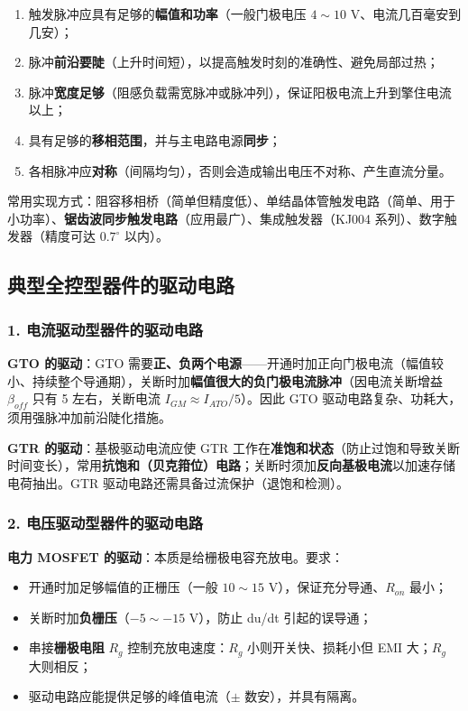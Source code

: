 \begin{enumerate}
  \item 触发脉冲应具有足够的\textbf{幅值和功率}（一般门极电压 $4\sim10$ V、电流几百毫安到几安）；
  \item 脉冲\textbf{前沿要陡}（上升时间短），以提高触发时刻的准确性、避免局部过热；
  \item 脉冲\textbf{宽度足够}（阻感负载需宽脉冲或脉冲列），保证阳极电流上升到擎住电流以上；
  \item 具有足够的\textbf{移相范围}，并与主电路电源\textbf{同步}；
  \item 各相脉冲应\textbf{对称}（间隔均匀），否则会造成输出电压不对称、产生直流分量。
\end{enumerate}

常用实现方式：阻容移相桥（简单但精度低）、单结晶体管触发电路（简单、用于小功率）、\textbf{锯齿波同步触发电路}（应用最广）、集成触发器（KJ004 系列）、数字触发器（精度可达 $0.7^\circ$ 以内）。

\subsection{典型全控型器件的驱动电路}

\subsubsection*{1. 电流驱动型器件的驱动电路}

\textbf{GTO 的驱动}：GTO 需要\textbf{正、负两个电源}——开通时加正向门极电流（幅值较小、持续整个导通期），关断时加\textbf{幅值很大的负门极电流脉冲}（因电流关断增益 $\beta_{off}$ 只有 5 左右，关断电流 $I_{GM}\approx I_{ATO}/5$）。因此 GTO 驱动电路复杂、功耗大，须用强脉冲加前沿陡化措施。

\textbf{GTR 的驱动}：基极驱动电流应使 GTR 工作在\textbf{准饱和状态}（防止过饱和导致关断时间变长），常用\textbf{抗饱和（贝克箝位）电路}；关断时须加\textbf{反向基极电流}以加速存储电荷抽出。GTR 驱动电路还需具备过流保护（退饱和检测）。

\subsubsection*{2. 电压驱动型器件的驱动电路}

\textbf{电力 MOSFET 的驱动}：本质是给栅极电容充放电。要求：
\begin{itemize}
  \item 开通时加足够幅值的正栅压（一般 $10\sim15$ V），保证充分导通、$R_{on}$ 最小；
  \item 关断时加\textbf{负栅压}（$-5\sim-15$ V），防止 du/dt 引起的误导通；
  \item 串接\textbf{栅极电阻} $R_g$ 控制充放电速度：$R_g$ 小则开关快、损耗小但 EMI 大；$R_g$ 大则相反；
  \item 驱动电路应能提供足够的峰值电流（$\pm$ 数安），并具有隔离。
\end{itemize}

